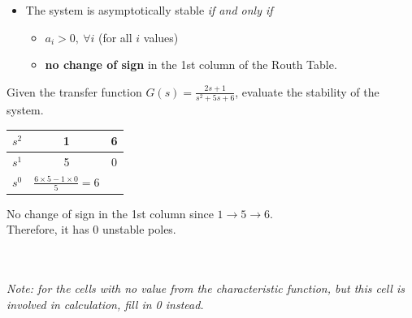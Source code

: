 \begin{itemize}
    \item The system is asymptotically stable \textit{if and only if}
        \begin{itemize}
            \item $a_{i}>0 ,\ \forall i$ (for all $i$ values)
            \item \textbf{no change of sign} in the 1st column of the Routh Table.
        \end{itemize}
\end{itemize}
\begin{ex}{}
Given the transfer function $\displaystyle G(s) = \frac{2s+1}{s^{2}+5s+6}$, evaluate the stability of the system.\\

\begin{minipage}{0.3\textwidth}
\renewcommand{\arraystretch}{1.2}
     \begin{table}[H]
        \begin{tabular}{c|c|c}
            $s^{2}$&1&6\\ \hline
            $s^{1}$&5&0\\ \hline \hline
            $s^{0}$&$\frac{6\times 5 -1\times 0}{5}=6$&
        \end{tabular}
     \end{table}
\end{minipage} \hfill
\begin{minipage}{0.7\textwidth}
 No change of sign in the 1st column since $1\to 5\to 6$. \\ Therefore, it has 0 unstable poles.
 \end{minipage} \ \\ \\
\textit{Note: for the cells with no value from the characteristic function, but this cell is involved in calculation, fill in 0 instead.}
\end{ex}
